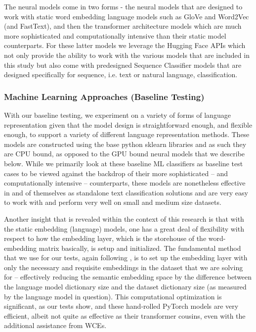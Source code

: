 \documentclass[final]{clv2025}
\begin{document}
The neural models come in two forms - the neural models that are designed to work with static word embedding language models such as GloVe and Word2Vec (and FastText), and then the transformer architecture models which are much more sophisticated and computationally intensive than their static model counterparts. For these latter models we leverage the Hugging Face APIs which not only provide the ability to work with the various models that are included in this study but also come with predesigned Sequence Classifier models that are designed specifically for sequence, i.e. text or natural language, classification.

\subsubsection{Machine Learning Approaches (Baseline Testing)}

With our baseline testing, we experiment on a variety of forms of language representation given that the model design is straightforward enough, and flexible enough, to support a variety of different language representation methods. These models are constructed using the base python sklearn libraries and as such they are CPU bound, as opposed to the GPU bound neural models that we describe below. While we primarily look at these baseline ML classifiers as baseline test cases to be viewed against the backdrop of their more sophisticated – and computationally intensive – counterparts, these models are nonetheless effective in and of themselves as standalone text classification solutions and are very easy to work with and perform very well on small and medium size datasets. 

Another insight that is revealed within the context of this research is that with the static embedding (language) models, one has a great deal of flexibility with respect to how the embedding layer, which is the storehouse of the word-embedding matrix basically, is setup and initialized. The fundamental method that we use for our tests, again following \cite{moreo}, is to set up the embedding layer with only the necessary and requisite embeddings in the dataset that we are solving for – effectively reducing the semantic embedding space by the difference between the language model dictionary size and the dataset dictionary size (as measured by the language model in question). This computational optimization is significant, as our tests show, and these hand-rolled PyTorch models are very efficient, albeit not quite as effective as their transformer cousins, even with the additional assistance from WCEs.
\end{document}
